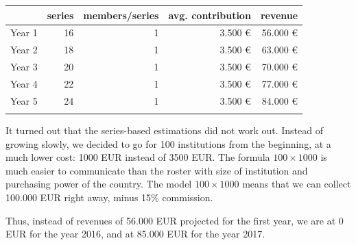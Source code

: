 \documentclass[nonflat,smallfont
]{langsci/langscibook}
\newcommand{\evaluation}[1]{
  \renewcommand{\tblslinecolour}{lsLightOrange}
  \tblssy{receipt}{Evaluation}{\vspace*{-5mm}#1}
}
\renewcommand{\tblssy}[4][black!12]{%
  \renewcommand{\langscisymbol}{#2}\renewcommand{\tblsboxcolor}{#1}
  \begin{mdframed}[style=yellowexercise,frametitle={#3}]
    #4
  \end{mdframed}
}
\begin{document}
{\noindent
\begin{tabularx}{\textwidth}{Xrrrr}
\lsptoprule
        &  series&  members/series&       avg. contribution &     revenue\\
\midrule
Year 1 &  16               &       1                                    &        3.500 €                                               &     56.000 €                                     \\
Year 2 &  18               &       1                                    &        3.500 €                                               &     63.000 €                                     \\
Year 3 &  20               &       1                                    &        3.500 €                                               &     70.000 €                                     \\
Year 4 &  22               &       1                                    &        3.500 €                                               &     77.000 €                                     \\
Year 5 &  24               &       1                                    &        3.500 €                                               &     84.000 €                                     \\
\lspbottomrule
\end{tabularx}
}
\evaluation{
It turned out that the series-based estimations did not work out. Instead of growing slowly, we decided to go for 100 institutions from the beginning, at a much lower cost: 1000 EUR instead of 3500 EUR. The formula $100 \times 1000$ is much easier to communicate than the roster with size of institution and purchasing power of the country. The model $100 \times 1000$ means that we can collect 100.000 EUR right away, minus 15\% commission. 

Thus, instead of revenues of 56.000 EUR projected for the first year, we are at 0 EUR for the year 2016, and at 85.000 EUR for the year 2017. 
}

\newpage 
\end{document}
